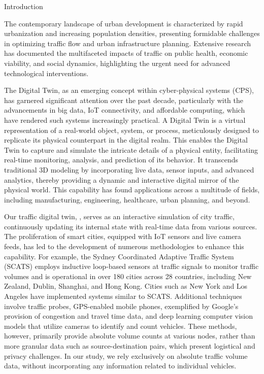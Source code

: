 Introduction

The contemporary landscape of urban development is characterized by rapid urbanization and increasing population densities, presenting formidable challenges in optimizing traffic flow and urban infrastructure planning. Extensive research has documented the multifaceted impacts of traffic on public health\cite{levy2010evaluation}, economic viability\cite{gorea2016financial}, and social dynamics\cite{anciaes2017social}, highlighting the urgent need for advanced technological interventions.


The Digital Twin, as an emerging concept within cyber-physical systems (CPS), has garnered significant attention over the past decade, particularly with the advancements in big data, IoT connectivity, and affordable computing, which have rendered such systems increasingly practical\cite{guo2017mobile}\cite{singh2021digital}. A Digital Twin is a virtual representation of a real-world object, system, or process, meticulously designed to replicate its physical counterpart in the digital realm\cite{VANDERHORN2021113524}. This enables the Digital Twin to capture and simulate the intricate details of a physical entity, facilitating real-time monitoring, analysis, and prediction of its behavior. It transcends traditional 3D modeling by incorporating live data, sensor inputs, and advanced analytics, thereby providing a dynamic and interactive digital mirror of the physical world\cite{VANDERHORN2021113524}. This capability has found applications across a multitude of fields, including manufacturing, engineering, healthcare, urban planning, and beyond.

Our traffic digital twin, \name, serves as an interactive simulation of city traffic, continuously updating its internal state with real-time data from various sources. The proliferation of smart cities, equipped with IoT sensors and live camera feeds, has led to the development of numerous methodologies to enhance this capability. For example, the Sydney Coordinated Adaptive Traffic System (SCATS)\cite{scats} employs inductive loop-based sensors at traffic signals to monitor traffic volumes and is operational in over 180 cities across 28 countries, including New Zealand, Dublin, Shanghai, and Hong Kong\cite{wiki:sydney_traffic_system}. Cities such as New York and Los Angeles have implemented systems similar to SCATS. Additional techniques involve traffic probes\cite{zhu2012probe}, GPS-enabled mobile phones\cite{rose2006mobile}, exemplified by Google’s provision of congestion and travel time data, and deep learning computer vision models that utilize cameras to identify and count vehicles. These methods, however, primarily provide absolute volume counts at various nodes, rather than more granular data such as source-destination pairs, which present logistical and privacy challenges. In our study, we rely exclusively on absolute traffic volume data, without incorporating any information related to individual vehicles.

